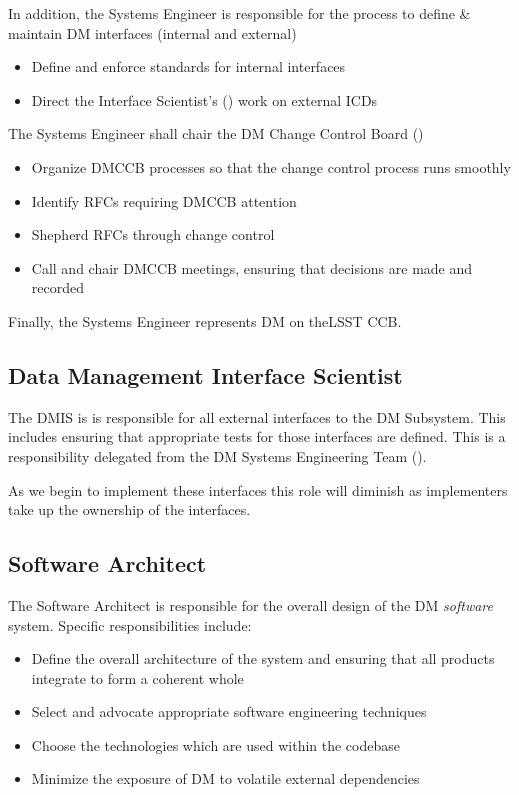 In addition, the \gls{Systems Engineer} is responsible for the process to define \& maintain DM interfaces (internal and external)

\begin{itemize}
\item Define and enforce standards for internal interfaces
\item Direct the Interface Scientist's () work on external ICDs
\end{itemize}

The \gls{Systems Engineer} shall chair the DM Change Control Board ()

\begin{itemize}
\item Organize DMCCB processes so that the change control process runs smoothly
\item Identify RFCs requiring DMCCB attention
\item Shepherd RFCs through change control
\item Call and chair \gls{DMCCB} meetings, ensuring that decisions are made and recorded
\end{itemize}

Finally, the \gls{Systems Engineer} represents DM on theLSST \gls{CCB}.

\subsection{Data Management Interface Scientist}\label{role:dmis}

The \gls{DMIS} is is responsible for all external interfaces to the DM Subsystem. This includes ensuring that appropriate tests for those interfaces are defined. This is a responsibility delegated from the DM Systems Engineering Team ().

As we begin to implement these interfaces this role will diminish as implementers take up the ownership of the interfaces.

\subsection{Software Architect \label{role:softarc}}

The Software Architect is responsible for the overall design of the DM \textit{software} system. Specific responsibilities include:

\begin{itemize}

\item{Define the overall architecture of the system and ensuring that all products integrate to form a coherent whole}
\item{Select and advocate appropriate software engineering techniques}
\item{Choose the technologies which are used within the codebase}
\item{Minimize the exposure of DM to volatile external dependencies}

\end{itemize}


